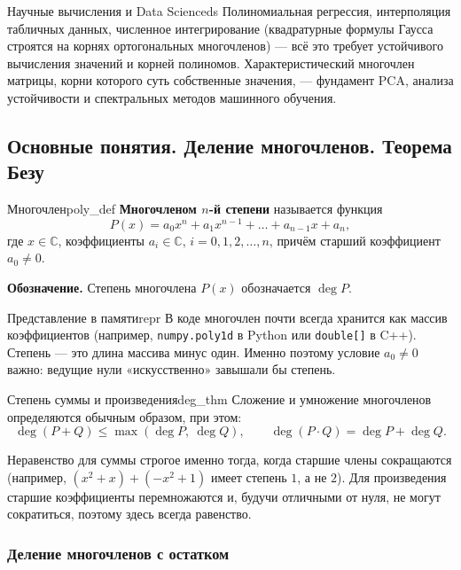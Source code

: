 \documentclass[12pt,a4paper]{article}
\begin{document}
\begin{remarkIT}{Научные вычисления и Data Science}{ds}
  Полиномиальная регрессия, интерполяция табличных данных, численное
  интегрирование (квадратурные формулы Гаусса строятся на корнях
  ортогональных многочленов) — всё это требует устойчивого вычисления
  значений и корней полиномов. Характеристический многочлен матрицы,
  корни которого суть собственные значения, — фундамент PCA, анализа
  устойчивости и спектральных методов машинного обучения.
\end{remarkIT}

\subsection{Основные понятия. Деление многочленов. Теорема Безу}

\begin{definition}{Многочлен}{poly_def}
  \textbf{Многочленом $n$-й степени} называется функция
  \[
    P(x) = a_0 x^n + a_1 x^{n-1} + \dots + a_{n-1} x + a_n,
  \]
  где $x \in \mathbb{C}$, коэффициенты $a_i \in \mathbb{C}$,
  $i = 0, 1, 2, \dots, n$, причём старший коэффициент $a_0 \neq 0$.
\end{definition}

\noindent\textbf{Обозначение.} Степень многочлена $P(x)$ обозначается
$\deg P$.

\begin{remarkIT}{Представление в памяти}{repr}
  В коде многочлен почти всегда хранится как массив коэффициентов
  (например, \texttt{numpy.poly1d} в Python или \texttt{double[]} в
  C++). Степень — это длина массива минус один. Именно поэтому условие
  $a_0 \neq 0$ важно: ведущие нули «искусственно» завышали бы степень.
\end{remarkIT}

\begin{theorem}{Степень суммы и произведения}{deg_thm}
  Сложение и умножение многочленов определяются обычным образом, при
  этом:
  \[
    \deg(P + Q) \le \max(\deg P,\ \deg Q), \qquad
    \deg(P \cdot Q) = \deg P + \deg Q.
  \]
\end{theorem}

\noindent Неравенство для суммы строгое именно тогда, когда старшие
члены сокращаются (например, $(x^2 + x) + (-x^2 + 1)$ имеет степень
$1$, а не $2$). Для произведения старшие коэффициенты перемножаются и,
будучи отличными от нуля, не могут сократиться, поэтому здесь всегда
равенство.

\subsubsection*{Деление многочленов с остатком}
\end{document}
